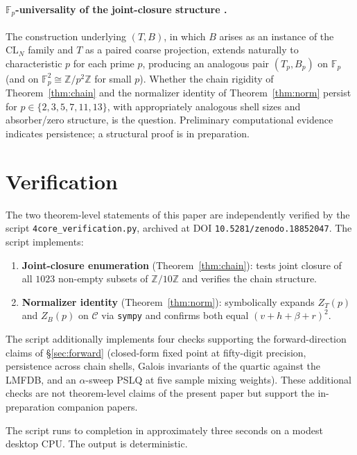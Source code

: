 \documentclass[11pt,reqno]{amsart}
\theoremstyle{plain}
\theoremstyle{definition}
\theoremstyle{remark}
\newcommand{\Z}{\mathbb{Z}}
\newcommand{\Zten}{\Z/10\Z}
\newcommand{\Cfour}{\mathcal{C}}
\newcommand{\CL}{\mathrm{CL}}
\newcommand{\F}{\mathbb{F}}
\begin{document}
\paragraph{$\F_p$-universality of the joint-closure structure
\cite{SandersGish2026FpUniversality}.} The construction
underlying $(T,B)$, in which $B$ arises as an instance of the
$\CL_{N}$ family and $T$ as a paired coarse projection, extends
naturally to characteristic $p$ for each prime $p$, producing an
analogous pair $(T_{p},B_{p})$ on $\F_{p}$ (and on
$\F_{p}^{2}\cong\Z/p^{2}\Z$ for small $p$). Whether the chain
rigidity of Theorem~\ref{thm:chain} and the normalizer identity
of Theorem~\ref{thm:norm} persist for $p\in\{2,3,5,7,11,13\}$,
with appropriately analogous shell sizes and absorber/zero
structure, is the question. Preliminary computational evidence
indicates persistence; a structural proof is in preparation.

\section{Verification}\label{sec:verify}

The two theorem-level statements of this paper are independently
verified by the script \texttt{4core\_verification.py}, archived
at DOI \texttt{10.5281/zenodo.18852047}. The script implements:

\begin{enumerate}\setlength\itemsep{0pt}
\item \textbf{Joint-closure enumeration} (Theorem~\ref{thm:chain}):
tests joint closure of all $1023$ non-empty subsets of $\Zten$
and verifies the chain structure.
\item \textbf{Normalizer identity} (Theorem~\ref{thm:norm}):
symbolically expands $Z_{T}(p)$ and $Z_{B}(p)$ on $\Cfour$ via
\texttt{sympy} and confirms both equal $(v+h+\beta+r)^{2}$.
\end{enumerate}

The script additionally implements four checks supporting the
forward-direction claims of \S\ref{sec:forward} (closed-form fixed
point at fifty-digit precision, persistence across chain shells,
Galois invariants of the quartic against the LMFDB, and an
$\alpha$-sweep PSLQ at five sample mixing weights). These
additional checks are not theorem-level claims of the present
paper but support the in-preparation companion papers.

The script runs to completion in approximately three seconds on a
modest desktop CPU. The output is deterministic.
\end{document}
